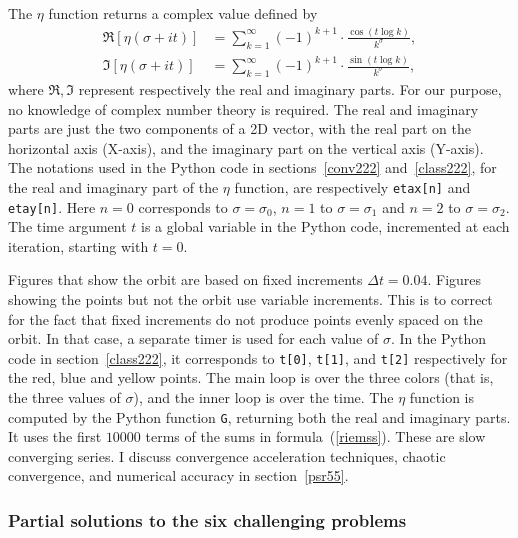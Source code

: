 \documentclass[oneside,10pt]{book}
\begin{document}
\noindent The $\eta$ function returns a complex value  defined by
\begin{equation}\label{riemss}
\begin{aligned}
 \Re[\eta(\sigma+it)] & =\sum_{k=1}^\infty (-1)^{k+1}\cdot \frac{\cos(t\log k)}{k^\sigma}, \\ %
 \Im[\eta(\sigma+it)] & =\sum_{k=1}^\infty (-1)^{k+1}\cdot \frac{\sin(t\log k)}{k^\sigma}, %
\end{aligned}
\end{equation}
where $\Re,\Im$ represent respectively the real and imaginary parts. For our purpose, no knowledge of complex number theory is required. The real and 
imaginary parts are just the two components of a 2D vector, with the real part on the horizontal axis (X-axis), and the imaginary part on the vertical axis (Y-axis).
The notations used in the Python code in sections~\ref{conv222} and~\ref{class222}, for the real and imaginary part of the $\eta$ function, are
respectively \texttt{etax[n]} and \texttt{etay[n]}. Here $n=0$  corresponds to $\sigma=\sigma_0$, $n=1$ to $\sigma=\sigma_1$ and $n=2$ to $\sigma=\sigma_2$. The time argument $t$ is a global variable in the Python code, incremented at each iteration, starting with $t=0$.

Figures that show the orbit are based on fixed increments $\Delta t=0.04$. Figures showing the points but not the orbit use variable
increments. This is to correct for the fact that fixed increments do not produce points evenly spaced on the orbit. In that case, a separate timer is
used for each value of $\sigma$. In the Python code in section~\ref{class222}, it corresponds 
to \texttt{t[0]}, \texttt{t[1]}, and \texttt{t[2]} respectively for the red, blue and yellow points. The main loop is over the three colors (that is, the three values of $\sigma$), and the
inner loop is over the time. The $\eta$ function is computed by the Python function \texttt{G}, returning both the real and imaginary parts. It uses
the first $\num{10000}$ terms of the sums in formula~(\ref{riemss}). 
These are slow converging series. I discuss convergence acceleration techniques, chaotic convergence, and numerical accuracy in section~\ref{psr55}.
 
\subsubsection{Partial solutions to the six challenging problems}\label{psrr}
\end{document}
